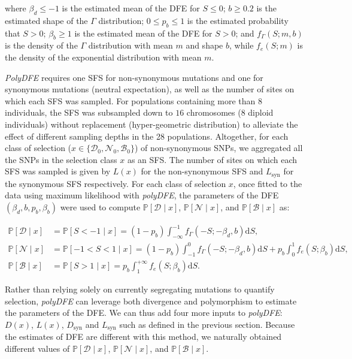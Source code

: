 \documentclass{article}
\newcommand{\der}{\text{d}}
\newcommand{\proba}{\mathbb{P}}
\newcommand{\SphyDel}{\mathcal{D}_0}
\newcommand{\SphyNeu}{\mathcal{N}_0}
\newcommand{\SphyBen}{\mathcal{B}_0}
\newcommand{\Sphyclass}{x}
\newcommand{\given}{\mid}
\newcommand{\Spop}{S}
\newcommand{\SpopDel}{\mathcal{D}}
\newcommand{\SpopNeu}{\mathcal{N}}
\newcommand{\SpopBen}{\mathcal{B}}
\newcommand{\AdvMean}{\beta_b}
\newcommand{\DelMean}{\beta_d}
\begin{document}
    where $\DelMean \leq -1 $ is the estimated mean of the DFE for $\Spop \leq 0$;
    $b \geq 0.2$ is the estimated shape of the $\Gamma$ distribution;
    $0 \leq p_b \leq 1$ is the estimated probability that $\Spop > 0$;
    $\AdvMean \geq 1$ is the estimated mean of the DFE for $\Spop > 0$;
    and $f_{\Gamma}(\Spop; m, b)$ is the density of the $\Gamma$ distribution with mean $m$ and shape $b$, while $f_{e}(\Spop; m)$ is the density of the exponential distribution with mean $m$.

    \textit{PolyDFE} requires one SFS for non-synonymous mutations and one for synonymous mutations (neutral expectation), as well as the number of sites on which each SFS was sampled.
    For populations containing more than $8$ individuals, the SFS was subsampled down to $16$ chromosomes ($8$ diploid individuals) without replacement (hyper-geometric distribution) to alleviate the effect of different sampling depths in the 28 populations.
    Altogether, for each class of selection ($\Sphyclass \in \{\SphyDel, \SphyNeu, \SphyBen \}$) of non-synonymous SNPs, we aggregated all the SNPs in the selection class $\Sphyclass$ as an SFS.
    The number of sites on which each SFS was sampled is given by $L(\Sphyclass)$ for the non-synonymous SFS and $L_{\text{syn}}$ for the synonymous SFS respectively.
    For each class of selection $\Sphyclass$, once fitted to the data using maximum likelihood with \textit{polyDFE}, the parameters of the DFE $\left( \DelMean , b, p_b, \AdvMean \right)$ were used to compute $\proba [ \SpopDel \given  \Sphyclass] $, $\proba [ \SpopNeu \given \Sphyclass]$, and $\proba [ \SpopBen \given \Sphyclass]$ as:

    \begin{align}
        \proba [ \SpopDel \given  \Sphyclass] &= \proba [ \Spop < -1 \given \Sphyclass ] = \left( 1 - p_b \right) \int_{-\infty}^{-1} f_{\Gamma}(-\Spop; -\DelMean, b) \der \Spop, \label{eq:polyProbaDel} \\
        \proba [ \SpopNeu \given \Sphyclass] &= \proba [ -1 < \Spop < 1 \given \Sphyclass ] = \left( 1 - p_b \right) \int_{-1}^{0} f_{\Gamma}(-\Spop; -\DelMean, b) \der \Spop + p_b \int_{0}^{1} f_{e}(\Spop; \AdvMean) \der \Spop, \\
        \proba [ \SpopBen \given \Sphyclass] &= \proba [ \Spop > 1 \given \Sphyclass] = p_b \int_{1}^{+\infty} f_{e}(\Spop; \AdvMean) \der \Spop. \label{eq:polyProbaAdv}
    \end{align}

    Rather than relying solely on currently segregating mutations to quantify selection, \textit{polyDFE} can leverage both divergence and polymorphism to estimate the parameters of the DFE.
    We can thus add four more inputs to \textit{polyDFE}: $D \left( \Sphyclass \right) $, $L \left( \Sphyclass \right)$, $D_{\text{syn}}$ and $L_{\text{syn}}$ such as defined in the previous section.
    Because the estimates of DFE are different with this method, we naturally obtained different values of $\proba [ \SpopDel \given  \Sphyclass] $, $\proba [ \SpopNeu \given \Sphyclass]$, and $\proba [ \SpopBen \given \Sphyclass]$.
\end{document}
